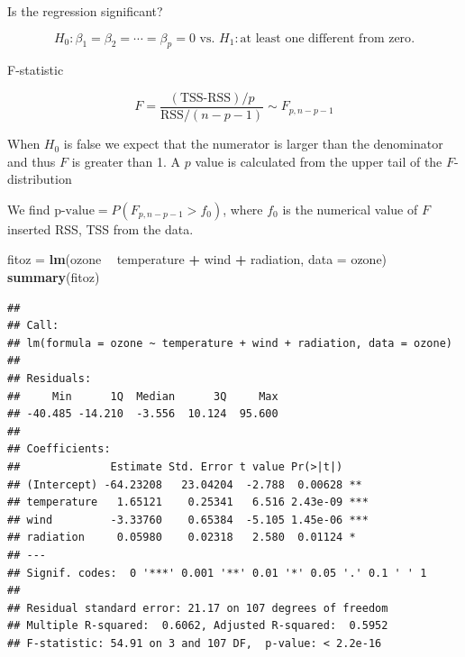 \documentclass[10pt,ignorenonframetext,]{beamer}
\newenvironment{Shaded}{\begin{snugshade}}{\end{snugshade}}
\newcommand{\KeywordTok}[1]{\textcolor[rgb]{0.13,0.29,0.53}{\textbf{#1}}}
\newcommand{\DataTypeTok}[1]{\textcolor[rgb]{0.13,0.29,0.53}{#1}}
\newcommand{\StringTok}[1]{\textcolor[rgb]{0.31,0.60,0.02}{#1}}
\newcommand{\OperatorTok}[1]{\textcolor[rgb]{0.81,0.36,0.00}{\textbf{#1}}}
\newcommand{\NormalTok}[1]{#1}
\begin{document}
\begin{frame}

\begin{block}{Is the regression significant?}

\[ H_0: \beta_1=\beta_2=\cdots= \beta_p =0 \text{ vs. } H_1: \text{at least one different from zero}.\]

F-statistic

\[F=\frac{(\text{TSS-RSS})/p}{\text{RSS}/(n-p-1)} \sim F_{p,n-p-1}\]

When \(H_0\) is false we expect that the numerator is larger than the
denominator and thus \(F\) is greater than 1. A \(p\) value is
calculated from the upper tail of the \(F\)-distribution

We find \(\text{p-value}=P(F_{p,n-p-1}>f_0)\), where \(f_0\) is the
numerical value of \(F\) inserted RSS, TSS from the data.

\end{block}

\end{frame}

\begin{frame}[fragile]

\footnotesize

\begin{Shaded}
\begin{Highlighting}[]
\NormalTok{fitoz =}\StringTok{ }\KeywordTok{lm}\NormalTok{(ozone }\OperatorTok{~}\StringTok{ }\NormalTok{temperature }\OperatorTok{+}\StringTok{ }\NormalTok{wind }\OperatorTok{+}\StringTok{ }\NormalTok{radiation, }\DataTypeTok{data =}\NormalTok{ ozone)}
\KeywordTok{summary}\NormalTok{(fitoz)}
\end{Highlighting}
\end{Shaded}

\begin{verbatim}
## 
## Call:
## lm(formula = ozone ~ temperature + wind + radiation, data = ozone)
## 
## Residuals:
##     Min      1Q  Median      3Q     Max 
## -40.485 -14.210  -3.556  10.124  95.600 
## 
## Coefficients:
##              Estimate Std. Error t value Pr(>|t|)    
## (Intercept) -64.23208   23.04204  -2.788  0.00628 ** 
## temperature   1.65121    0.25341   6.516 2.43e-09 ***
## wind         -3.33760    0.65384  -5.105 1.45e-06 ***
## radiation     0.05980    0.02318   2.580  0.01124 *  
## ---
## Signif. codes:  0 '***' 0.001 '**' 0.01 '*' 0.05 '.' 0.1 ' ' 1
## 
## Residual standard error: 21.17 on 107 degrees of freedom
## Multiple R-squared:  0.6062, Adjusted R-squared:  0.5952 
## F-statistic: 54.91 on 3 and 107 DF,  p-value: < 2.2e-16
\end{verbatim}

\normalsize

\end{frame}
\end{document}
